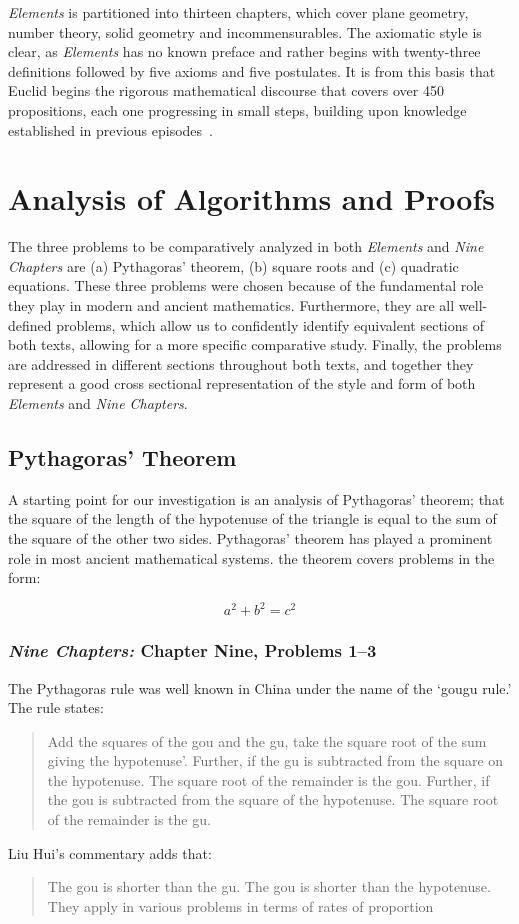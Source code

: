 \documentclass[12pt]{article}
\begin{document}
\emph{Elements} is partitioned into thirteen chapters,
which cover plane geometry, number theory, solid
geometry and incommensurables. The axiomatic
style is clear, as \emph{Elements} has no known preface
and rather begins with twenty-three definitions
followed by five axioms and five postulates. It is
from this basis that Euclid begins the rigorous
mathematical discourse that covers over 450
propositions, each one progressing in small steps,
building upon knowledge established in previous
episodes~\cite{Joyce}.

\section{Analysis of Algorithms and Proofs}

The three problems to be comparatively
analyzed in both \emph{Elements} and \emph{Nine Chapters} are
(a) Pythagoras’ theorem, (b) square roots and (c)
quadratic equations. These three problems were
chosen because of the fundamental role they play
in modern and ancient mathematics. Furthermore,
they are all well-defined problems, which allow us
to confidently identify equivalent sections of both
texts, allowing for a more specific comparative
study. Finally, the problems are addressed in
different sections throughout both texts, and
together they represent a good cross sectional
representation of the style and form of both
\emph{Elements} and \emph{Nine Chapters}.

\subsection{Pythagoras' Theorem}
A starting point for our investigation is an analysis
of Pythagoras’ theorem; that the square of the
length of the hypotenuse of the triangle is equal to
the sum of the square of the other two sides.
Pythagoras’ theorem has played a
prominent role in most ancient mathematical
systems.
the theorem covers problems in the form:

\begin{equation}
  a^2 + b^2 = c^2
\end{equation}

\subsubsection{\emph{Nine Chapters:} Chapter Nine, Problems 1--3}
The Pythagoras rule was well known in China
under the name of the ‘gougu rule.’ The rule
states:
\begin{quote}
  Add the squares of the gou and the gu, take the
  square root of the sum giving the hypotenuse’.
  Further, if the gu is subtracted from the square on
  the hypotenuse. The square root of the remainder
  is the gou. Further, if the gou is subtracted from
  the square of the hypotenuse. The square root of
  the remainder is the gu.
\end{quote}
Liu Hui's commentary adds that:
\begin{quote}
  The gou is shorter than the gu. The gou is
  shorter than the hypotenuse. They apply in
  various problems in terms of rates of proportion
\end{quote}
\end{document}
